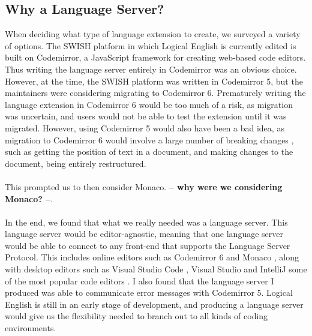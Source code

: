 \documentclass[../main.tex]{subfiles}
\begin{document}
\subsection{Why a Language Server?}
When deciding what type of language extension to create, we surveyed a variety of options. The SWISH platform in which Logical English is currently edited is built on Codemirror, a JavaScript framework for creating web-based code editors. Thus writing the language server entirely in Codemirror was an obvious choice. However, at the time, the SWISH platform was written in Codemirror 5, but the maintainers were considering migrating to Codemirror 6. Prematurely writing the language extension in Codemirror 6 would be too much of a risk, as migration was uncertain, and users would not be able to test the extension until it was migrated. However, using Codemirror 5 would also have been a bad idea, as migration to Codemirror 6 would involve a large number of breaking changes \cite{codemirror_migration}, such as getting the position of text in a document, and making changes to the document, being entirely restructured.\\ \\ 
This prompted us to then consider Monaco. \textbf{-- why were we considering Monaco? --}.
\\ \\ 
In the end, we found that what we really needed was a language server. This language server would be editor-agnostic, meaning that one language server would be able to connect to any front-end that supports the Language Server Protocol. This includes online editors such as Codemirror 6 \cite{codemirror_6_language_server} and Monaco \cite{monaco_language_server}, along with desktop editors such as Visual Studio Code \cite{vsc_langserver_docs}, Visual Studio \cite{visual_studio_language_server} and IntelliJ \cite{intellij_language_server} some of the most popular code editors \cite{ide_rankings}. I also found that the language server I produced was able to communicate error messages with Codemirror 5. Logical English is still in an early stage of development, and producing a language server would give us the flexibility needed to branch out to all kinds of coding environments.
\end{document}
